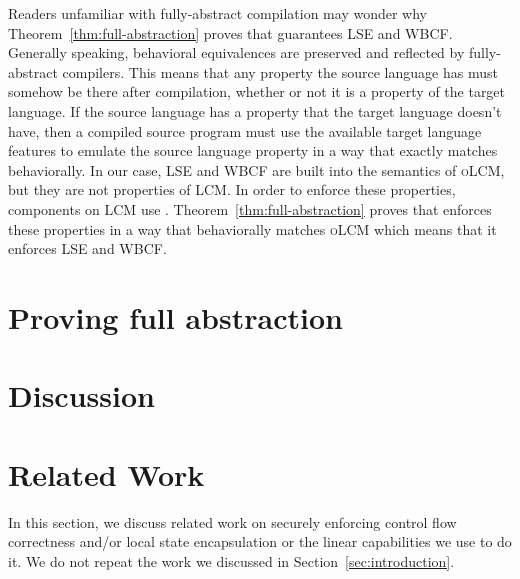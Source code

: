 \documentclass{jfp}
\newcommand{\trgcm}{\textsc{LCM}}
\newcommand{\srccm}{\textsc{oLCM}}
\begin{document}
Readers unfamiliar with fully-abstract compilation may wonder why Theorem~\ref{thm:full-abstraction} proves that \stktokens{} guarantees LSE and WBCF.
Generally speaking, behavioral equivalences are preserved and reflected by fully-abstract compilers.
This means that any property the source language has must somehow be there after compilation, whether or not it is a property of the target language.
If the source language has a property that the target language doesn't have, then a compiled source program must use the available target language features to emulate the source language property in a way that exactly matches behaviorally.
In our case, LSE and WBCF are built into the semantics of \srccm{}, but they are not properties of \trgcm{}.
In order to enforce these properties, components on \trgcm{} use \stktokens{}.
Theorem~\ref{thm:full-abstraction} proves that \stktokens{} enforces these properties in a way that behaviorally matches \srccm{} which means that it enforces LSE and WBCF.



\section{Proving full abstraction}
\label{sec:fa-proof}


\section{Discussion}
\label{sec:discussion}


\section{Related Work}
\label{sec:related-work}
In this section, we discuss related work on securely enforcing control flow correctness and/or local state encapsulation or the linear capabilities we use to do it.
We do not repeat the work we discussed in Section~\ref{sec:introduction}.
\end{document}

